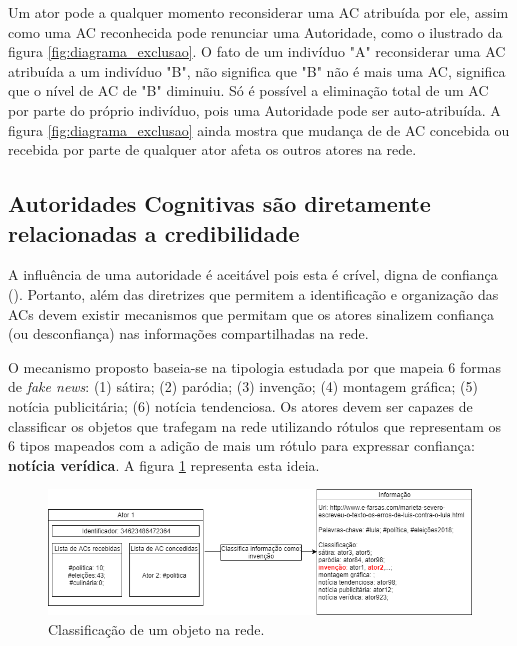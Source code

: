 Um ator pode a qualquer momento reconsiderar uma AC atribuída por ele, assim como uma AC reconhecida pode renunciar uma Autoridade, como o ilustrado da figura \ref{fig:diagrama_exclusao}. O fato de um indivíduo "A" reconsiderar uma AC atribuída a um indivíduo "B", não significa que "B" não é mais uma AC, significa que o nível de AC de "B" diminuiu. Só é possível a eliminação total de um AC por parte do próprio indivíduo, pois uma Autoridade pode ser auto-atribuída. A figura \ref{fig:diagrama_exclusao} ainda mostra que mudança de de AC concebida ou recebida por parte de qualquer ator afeta os outros atores na rede.


\subsection{Autoridades Cognitivas são diretamente relacionadas a credibilidade}

A influência de uma autoridade é aceitável pois esta é crível, digna de confiança (\cite{Wilson1983}). Portanto, além das diretrizes que permitem a identificação e organização das ACs devem existir mecanismos que permitam que os atores sinalizem confiança (ou desconfiança) nas informações compartilhadas na rede. 

O mecanismo proposto baseia-se na tipologia estudada por \cite{tandoc_defining_2017} que mapeia 6 formas de \emph{fake news}: (1) sátira; (2) paródia; (3) invenção; (4) montagem gráfica; (5) notícia publicitária; (6) notícia tendenciosa. Os atores devem ser capazes de classificar os objetos que trafegam na rede utilizando rótulos que representam os 6 tipos mapeados com a adição de mais um rótulo para expressar confiança: \textbf{notícia verídica}. A figura \ref{fig:diagrama_classificacao} representa esta ideia.

\begin{figure}[ht]
\centering
\includegraphics[scale=0.55]{4-proposta/diagrama_atribuicao_classificacao.png}
\caption{Classificação de um objeto na rede.}
\label{fig:diagrama_classificacao}
\end{figure}

